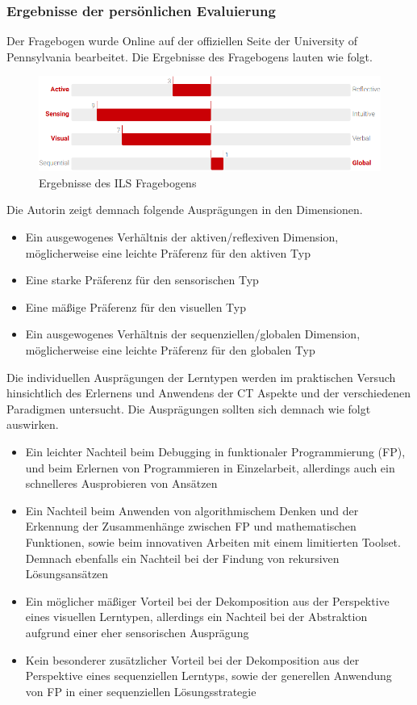 \subsubsection{Ergebnisse der persönlichen Evaluierung}
Der Fragebogen wurde Online auf der offiziellen Seite der University of Pennsylvania bearbeitet. Die Ergebnisse des Fragebogens lauten wie folgt.

\begin{figure}[H]
    \centering
    \includegraphics[width=1\linewidth]{Figures/Section_4/ILS_result}
    \caption{Ergebnisse des ILS Fragebogens}
\end{figure}

Die Autorin zeigt demnach folgende Ausprägungen in den Dimensionen.

\begin{itemize}
    \item Ein ausgewogenes Verhältnis der aktiven/reflexiven Dimension, möglicherweise eine leichte Präferenz für den aktiven Typ
    \item Eine starke Präferenz für den sensorischen Typ
    \item Eine mäßige Präferenz für den visuellen Typ
    \item Ein ausgewogenes Verhältnis der sequenziellen/globalen Dimension, möglicherweise eine leichte Präferenz für den globalen Typ
\end{itemize}

Die individuellen Ausprägungen der Lerntypen werden im praktischen Versuch hinsichtlich des Erlernens und Anwendens der CT Aspekte und der verschiedenen Paradigmen untersucht.
Die Ausprägungen sollten sich demnach wie folgt auswirken.

\begin{itemize}
    \item Ein leichter Nachteil beim Debugging in funktionaler Programmierung (FP), und beim Erlernen von Programmieren in Einzelarbeit, allerdings auch ein schnelleres Ausprobieren von Ansätzen
    \item Ein Nachteil beim Anwenden von algorithmischem Denken und der Erkennung der Zusammenhänge zwischen FP und mathematischen Funktionen, sowie beim innovativen Arbeiten mit einem limitierten Toolset. Demnach ebenfalls ein Nachteil bei der Findung von rekursiven Lösungsansätzen
    \item Ein möglicher mäßiger Vorteil bei der Dekomposition aus der Perspektive eines visuellen Lerntypen, allerdings ein Nachteil bei der Abstraktion aufgrund einer eher sensorischen Ausprägung
    \item Kein besonderer zusätzlicher Vorteil bei der Dekomposition aus der Perspektive eines sequenziellen Lerntyps, sowie der generellen Anwendung von FP in einer sequenziellen Lösungsstrategie
\end{itemize}


